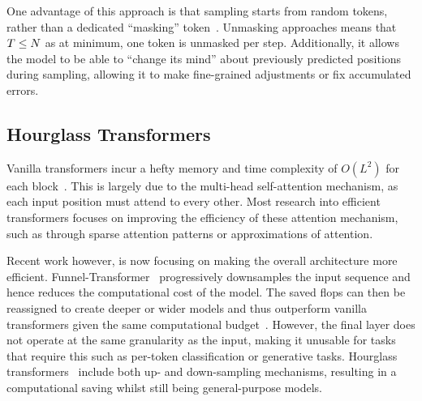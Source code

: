 One advantage of this approach is that sampling starts from random tokens,
rather than a dedicated ``masking''
token~\cite{bondtaylor2021unleashing,austin2021structured}. Unmasking approaches
means that $T \leq N$ as at minimum, one token is unmasked per step.
Additionally, it allows the model to be able to ``change its mind'' about
previously predicted positions during sampling, allowing it to make fine-grained
adjustments or fix accumulated errors.



\subsection{Hourglass Transformers}
\label{subsec:hourglass}

Vanilla transformers incur a hefty memory and time complexity of $O(L^2)$ for
each block~\cite{vaswani2017attention}. This is largely due to the multi-head
self-attention mechanism, as each input position must attend to every other.
Most research into efficient transformers focuses on improving the efficiency of
these attention mechanism, such as through sparse attention patterns or
approximations of attention.

Recent work however, is now focusing on making the overall architecture more
efficient. Funnel-Transformer~\cite{dai2020funneltransformer} progressively
downsamples the input sequence and hence reduces the computational cost of the
model. The saved \glspl{flop} can then be reassigned to create deeper or wider models
and thus outperform vanilla transformers given the same computational
budget~\cite{dai2020funneltransformer}. However, the final layer does not
operate at the same granularity as the input, making it unusable for tasks that
require this such as per-token classification or generative tasks. Hourglass
transformers~\cite{nawrot2021hierarchical} include both up- and down-sampling
mechanisms, resulting in a computational saving whilst still being
general-purpose models.
